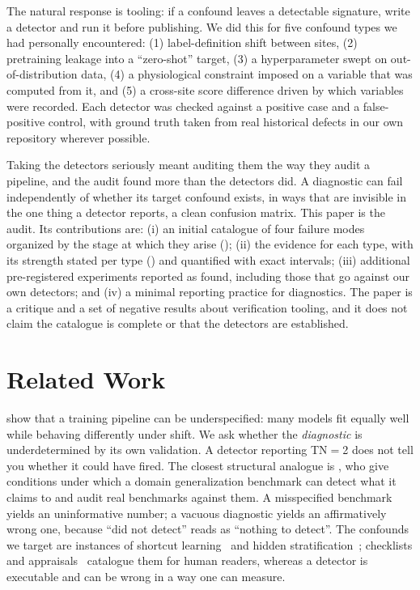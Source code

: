 \documentclass[pmlr,twocolumn,10pt]{jmlr}
\begin{document}
The natural response is tooling: if a confound leaves a detectable signature,
write a detector and run it before publishing. We did this for five confound
types we had personally encountered: (1) label-definition shift between sites,
(2) pretraining leakage into a ``zero-shot'' target, (3) a hyperparameter swept
on out-of-distribution data, (4) a physiological constraint imposed on a
variable that was computed from it, and (5) a cross-site score difference
driven by which variables were recorded. Each detector was checked against a
positive case and a false-positive control, with ground truth taken from real
historical defects in our own repository wherever possible.

Taking the detectors seriously meant auditing them the way they audit a
pipeline, and the audit found more than the detectors did. A diagnostic can
fail independently of whether its target confound exists, in ways that are
invisible in the one thing a detector reports, a clean confusion matrix. This
paper is the audit. Its contributions are:
(i) an initial catalogue of four failure modes organized by the stage at which
they arise ();
(ii) the evidence for each type, with its strength stated per type
() and quantified with exact intervals;
(iii) additional pre-registered experiments reported as found, including those
that go against our own detectors; and
(iv) a minimal reporting practice for diagnostics. The paper is a critique and
a set of negative results about verification tooling, and it does not claim the
catalogue is complete or that the detectors are established.

\section{Related Work}
\label{sec:related}

\citet{damour2022underspecification} show that a training pipeline can be
underspecified: many models fit equally well while behaving differently under
shift. We ask whether the \emph{diagnostic} is underdetermined by its own
validation. A detector reporting TN$=$2 does not tell you whether it could have
fired. The closest structural analogue is \citet{salaudeen2025misspecified},
who give conditions under which a domain generalization benchmark can detect
what it claims to and audit real benchmarks against them. A misspecified
benchmark yields an uninformative number; a vacuous diagnostic yields an
affirmatively wrong one, because ``did not detect'' reads as ``nothing to
detect''. The confounds we target are instances of shortcut
learning~\citep{geirhos2020shortcut} and hidden
stratification~\citep{oakdenrayner2020hidden}; checklists and
appraisals~\citep{kapoor2023leakage,wynants2020prediction,roberts2021common}
catalogue them for human readers, whereas a detector is executable and can be
wrong in a way one can measure.
\end{document}
